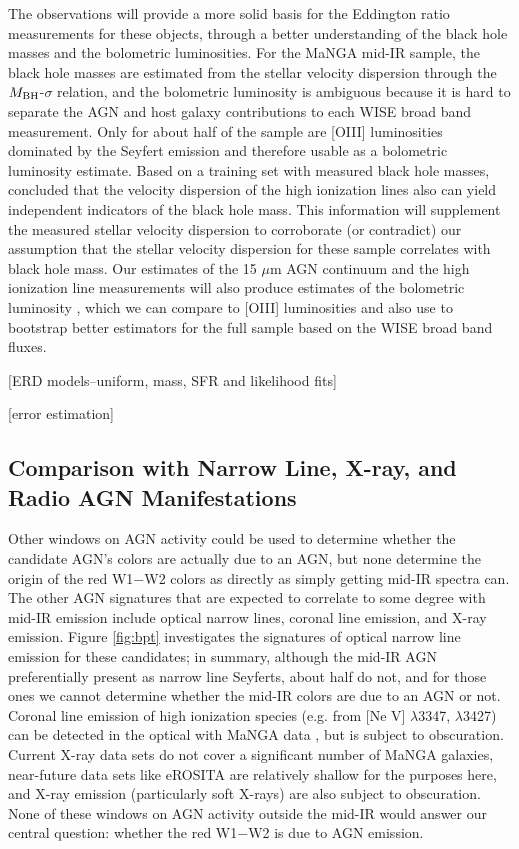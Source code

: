 \documentclass[12pt, preprint]{hacked-aastex}
\begin{document}
The observations will provide a more solid basis for the 
Eddington ratio measurements for these objects, through
a better understanding of the black hole masses and the
bolometric luminosities. For the MaNGA mid-IR sample, 
the black hole masses are estimated from the stellar velocity
dispersion through the $M_{\rm BH}$-$\sigma$ relation,
and the bolometric luminosity is ambiguous because it is 
hard to separate the AGN and host galaxy contributions 
to each WISE broad band measurement. Only for about 
half of the sample are [OIII] luminosities dominated 
by the Seyfert emission and therefore usable as a
bolometric luminosity estimate.
Based on a training set with measured black hole masses,
\cite{dasyra08a} concluded that the velocity dispersion of the 
high ionization lines also can yield independent 
indicators of the black hole mass. 
This information will supplement the 
measured stellar velocity dispersion to 
corroborate (or contradict) our assumption that the 
stellar velocity dispersion for these 
sample correlates with black hole mass.
Our
estimates of the 15 $\mu$m AGN continuum and the high
ionization line
measurements will also produce estimates of the 
bolometric luminosity \cite{dasyra08a, shen20a}, which we 
can compare to [OIII] luminosities and also use 
to bootstrap better estimators for the full sample
based on the WISE broad band fluxes.

[ERD models--uniform, mass, SFR and likelihood fits]

[error estimation]

\subsection{Comparison with Narrow Line, X-ray, and Radio AGN Manifestations}

Other windows on AGN activity could be used to
determine whether the candidate AGN's colors are
actually due to an AGN,
but none determine the origin of 
the red W1$-$W2 colors as directly as simply getting
mid-IR spectra can. The other AGN signatures that are
expected to correlate to some degree with mid-IR 
emission include optical narrow lines, 
coronal line  emission, and X-ray emission.
Figure \ref{fig:bpt} investigates the signatures of
optical narrow line emission for these candidates;
in summary, although the mid-IR AGN preferentially
present as narrow line Seyferts, about half do not,
and for those ones we cannot determine whether the 
mid-IR colors are due to an AGN or not. Coronal
line emission of high ionization species (e.g. from 
[Ne V]  $\lambda$3347, $\lambda$3427)
can be detected in the optical with MaNGA data 
\cite{negus21a}, but is subject to obscuration. 
Current X-ray data sets do not 
cover a significant number of MaNGA galaxies, 
near-future data sets like eROSITA are relatively 
shallow for the purposes here, and X-ray 
emission (particularly soft X-rays)
are also subject to obscuration. 
None of these windows on AGN activity outside the 
mid-IR would answer
our central question: whether the red W1$-$W2 is 
due to AGN emission.
\end{document}
